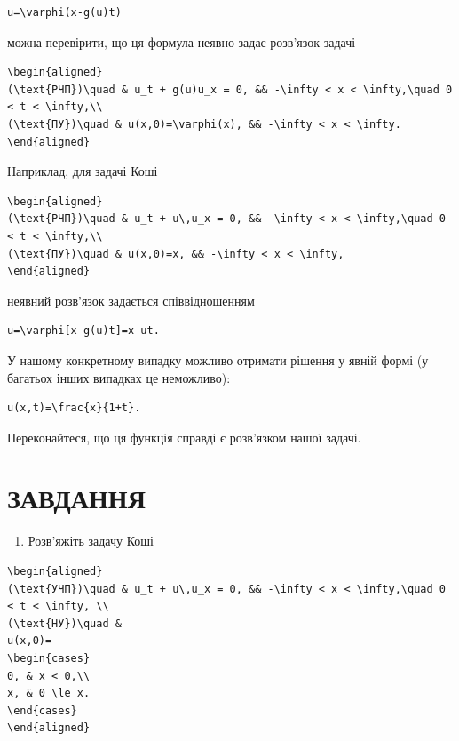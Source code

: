 \documentclass[
  ukrainian,
]{article}
\providecommand{\tightlist}{%
  \setlength{\itemsep}{0pt}\setlength{\parskip}{0pt}}
\begin{document}
\begin{verbatim}
u=\varphi(x-g(u)t)
\end{verbatim}

можна перевірити, що ця формула неявно задає розв'язок задачі

\begin{verbatim}
\begin{aligned}
(\text{РЧП})\quad & u_t + g(u)u_x = 0, && -\infty < x < \infty,\quad 0 < t < \infty,\\
(\text{ПУ})\quad & u(x,0)=\varphi(x), && -\infty < x < \infty.
\end{aligned}
\end{verbatim}

Наприклад, для задачі Коші

\begin{verbatim}
\begin{aligned}
(\text{РЧП})\quad & u_t + u\,u_x = 0, && -\infty < x < \infty,\quad 0 < t < \infty,\\
(\text{ПУ})\quad & u(x,0)=x, && -\infty < x < \infty,
\end{aligned}
\end{verbatim}

неявний розв'язок задається співвідношенням

\begin{verbatim}
u=\varphi[x-g(u)t]=x-ut.
\end{verbatim}

У нашому конкретному випадку можливо отримати рішення у явній формі (у
багатьох інших випадках це неможливо):

\begin{verbatim}
u(x,t)=\frac{x}{1+t}.
\end{verbatim}

Переконайтеся, що ця функція справді є розв'язком нашої задачі.

\section{ЗАВДАННЯ}\label{ux437ux430ux432ux434ux430ux43dux43dux44f-7}

\begin{enumerate}
\def\labelenumi{\arabic{enumi}.}
\tightlist
\item
  Розв'яжіть задачу Коші
\end{enumerate}

\begin{verbatim}
\begin{aligned}
(\text{УЧП})\quad & u_t + u\,u_x = 0, && -\infty < x < \infty,\quad 0 < t < \infty, \\
(\text{НУ})\quad &
u(x,0)=
\begin{cases}
0, & x < 0,\\
x, & 0 \le x.
\end{cases}
\end{aligned}
\end{verbatim}
\end{document}
